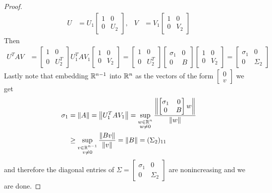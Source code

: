 \begin{proof}
\begin{align*}
U &= 
U_1 \begin{bmatrix}
1 & 0 \\
0 & U_2
\end{bmatrix}, &
V &= V_1 
\begin{bmatrix}
1 & 0 \\
0 & V_2
\end{bmatrix}
\end{align*}
Then 
\begin{align*}
U^T A V 
&=
\begin{bmatrix}
1 & 0 \\
0 & U_2^T
\end{bmatrix} U_1^T A V_1 
\begin{bmatrix}
1 & 0 \\
0 & V_2
\end{bmatrix} 
= 
\begin{bmatrix}
1 & 0 \\
0 & U_2^T
\end{bmatrix}
\begin{bmatrix}
\sigma_1 & 0 \\
0 & B
\end{bmatrix}
\begin{bmatrix}
1 & 0 \\
0 & V_2
\end{bmatrix} 
= 
\begin{bmatrix}
\sigma_1 & 0 \\
0 & \Sigma_2
\end{bmatrix} 
\end{align*}
Lastly note that embedding $\mathbb{R}^{n-1}$ into $\mathbb{R}^n$ as the vectors of the form $\begin{bmatrix}0 \\ v\end{bmatrix}$ we get
\begin{align*}
\sigma_1 &= \left \lVert A \right \rVert = \left \lVert U_1^T A V_1 \right \rVert 
= \sup_{\substack {w \in \mathbb{R}^n \\ w \neq 0}} \frac{\left \lVert \begin{bmatrix}
\sigma_1 & 0 \\
0 & B
\end{bmatrix}w \right \rVert} {\left \lVert w \right \rVert} \\
&\geq \sup_{\substack {v \in \mathbb{R}^{n-1} \\ v \neq 0}} \frac{\left \lVert Bv \right \rVert} {\left \lVert v \right \rVert} 
= \left \lVert B \right \rVert = (\Sigma_2)_{11}\\
\end{align*}
and therefore the diagonal entries of $\Sigma=\begin{bmatrix}
\sigma_1 & 0 \\
0 & \Sigma_2
\end{bmatrix}$ are nonincreasing and we are done.
\end{proof}

